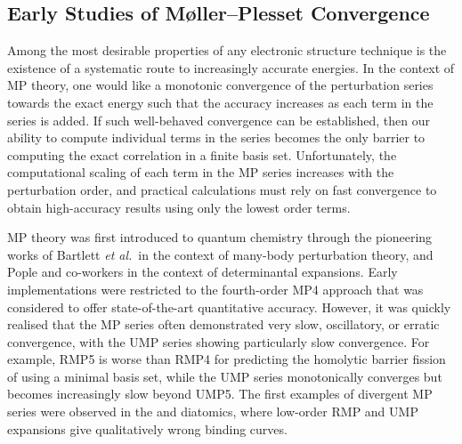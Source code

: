\documentclass[aps,prb,reprint,noshowkeys,linenumbers,superscriptaddress]{revtex4-1}
\newcommand{\etal}{\textit{et al.}}
\begin{document}
\subsection{Early Studies of M{\o}ller--Plesset Convergence} %

 Among the most desirable properties of any electronic structure technique is the existence of 
a systematic route to increasingly accurate energies. 
In the context of MP theory, one would like a monotonic convergence of the perturbation
series towards the exact energy such that the accuracy increases as each term in the series is added.
If such well-behaved convergence can be established, then our ability to compute individual 
terms in the series becomes the only barrier to computing the exact correlation in a finite basis set.
Unfortunately, the computational scaling of each term in the MP series increases with the perturbation
order, and practical calculations must rely on fast convergence
to obtain high-accuracy results using only the lowest order terms.

MP theory was first introduced to quantum chemistry through the pioneering
works of Bartlett \etal\ in the context of many-body perturbation theory,\cite{Bartlett_1975}
and Pople and co-workers in the context of determinantal expansions.\cite{Pople_1976,Pople_1978}
Early implementations were restricted to the fourth-order MP4 approach that was considered
to offer state-of-the-art quantitative accuracy.\cite{Pople_1978,Krishnan_1980}
However, it was quickly realised that the MP series often demonstrated very slow, oscillatory, 
or erratic convergence, with the UMP series showing particularly slow convergence.\cite{Laidig_1985,Knowles_1985,Handy_1985}
For example, RMP5 is worse than RMP4 for predicting the homolytic barrier fission of  using a minimal basis set, 
while the UMP series monotonically converges but becomes increasingly slow beyond UMP5.\cite{Gill_1986}
The first examples of divergent MP series were observed in the  and  
diatomics, where low-order RMP and UMP expansions give qualitatively wrong binding curves.\cite{Laidig_1987} 
\end{document}
